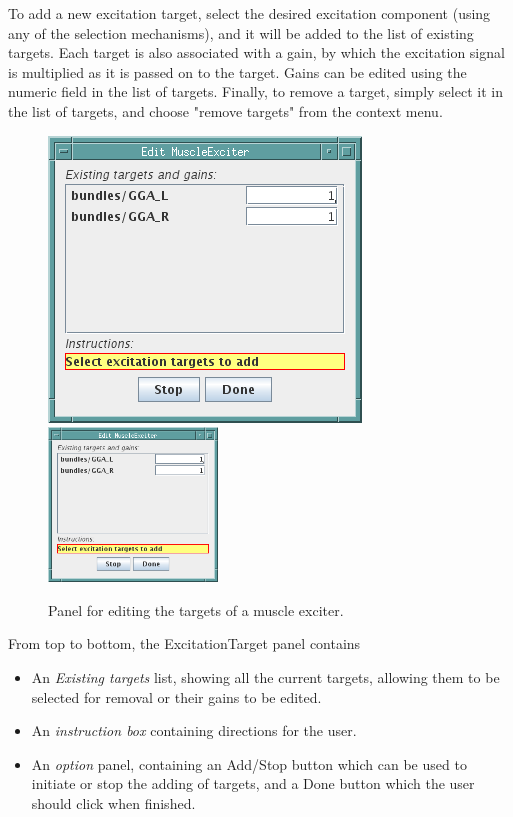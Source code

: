 \documentclass{article}
\begin{document}
To add a new excitation target, select the desired excitation
component (using any of the selection mechanisms), and it will be
added to the list of existing targets. Each target is also associated
with a gain, by which the excitation signal is multiplied as it is
passed on to the target. Gains can be edited using the numeric field
in the list of targets. Finally, to remove a target, simply select it
in the list of targets, and choose {\sf "remove targets"} from the context
menu.

\begin{figure}
\begin{center}
\iflatexml
\includegraphics[]{images/excitationTargetPanel}
\else
\includegraphics[width=0.40\textwidth]{images/excitationTargetPanel}
\fi
\end{center}
\caption{Panel for editing the targets of a muscle exciter.}%
\label{excitationTargetPanelFig}
\end{figure}

From top to bottom, the ExcitationTarget panel contains

\begin{itemize}

\item An {\it Existing targets} list, showing all the current
targets, allowing them to be selected for removal or their gains to be edited.

\item An {\it instruction box} containing directions for the user.

\item An {\it option} panel, containing an {\sf Add/Stop} button which can be used
to initiate or stop the adding of targets, and a {\sf Done} button which
the user should click when finished.

\end{itemize}
\end{document}
